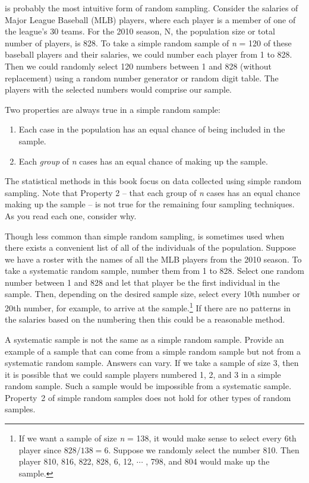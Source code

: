  is probably the most intuitive form of random sampling. Consider the salaries of Major League Baseball (MLB) players, where each player is a member of one of the league's 30 teams. For the 2010 season, N, the population size or total number of players, is 828. To take a simple random sample of \textit{n} = 120 of these baseball players and their salaries, we could number each player from 1 to 828. Then we could randomly select 120 numbers between 1 and 828 (without replacement) using a random number generator or random digit table. The players with the selected numbers would comprise our sample.

Two properties are always true in a simple random sample:
\begin{enumerate}
\item Each case in the population has an equal chance of being included in the sample.
\item Each \emph{group} of \textit{n} cases has an equal chance of making up the sample.
\end{enumerate}

The statistical methods in this book focus on data collected using simple random sampling. Note that Property 2 -- that each group of \textit{n} cases has an equal chance making up the sample -- is not true for the remaining four sampling techniques. As you read each one, consider why.

Though less common than simple random sampling,  is sometimes used when there exists a convenient list of all of the individuals of the population. Suppose we have a roster with the names of all the MLB players from the 2010 season. To take a systematic random sample, number them from 1 to 828. Select one random number between 1 and 828 and let that player be the first individual in the sample. Then, depending on the desired sample size, select every 10th number or 20th number, for example, to arrive at the sample.\footnote{If we want a sample of size \textit{n} = 138, it would make sense to select every 6th player since \mbox{$828/138 = 6$.} Suppose we randomly select the number 810. Then player 810, 816, 822, 828, 6, 12, $\cdots$ , 798, and 804 would make up the sample.} If there are no patterns in the salaries based on the numbering then this could be a reasonable method.

\begin{example}{A systematic sample is not the same as a simple random sample. Provide an example of a sample that can come from a simple random sample but not from a systematic random sample.}
Answers can vary. If we take a sample of size 3, then it is possible that we could sample players numbered 1, 2, and 3 in a simple random sample. Such a sample would be impossible from a systematic sample. Property~2 of simple random samples does not hold for other types of random samples.
\end{example}

